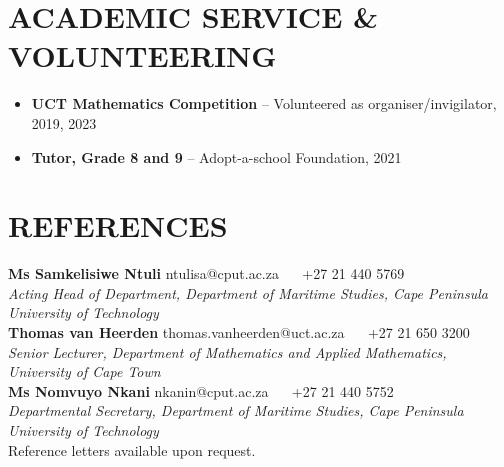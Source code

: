 \documentclass[letterpaper,11pt]{article}
\newcommand{\resumeItem}[1]{
  \item\small{
    {#1 \vspace{-1pt}}
  }
}
\newcommand{\resumeItemListStart}{\begin{itemize}[leftmargin=0.1in]}
\newcommand{\resumeItemListEnd}{\end{itemize}\vspace{-5pt}}
\begin{document}
\vspace{4pt}

\section{\color{airforceblue}ACADEMIC SERVICE \& VOLUNTEERING}

      \resumeItemListStart
        \resumeItem{\normalsize{\textbf{UCT Mathematics Competition} -- Volunteered as organiser/invigilator, 2019, 2023}}
        \vspace{-3pt}
        \resumeItem{\normalsize{\textbf{Tutor, Grade 8 and 9} -- Adopt-a-school Foundation, 2021}}
      \resumeItemListEnd

\vspace{4pt}

\section{\color{airforceblue}REFERENCES}
 \begin{itemize}[leftmargin=0in, label={}]
    \small{\item{
     \textbf{\normalsize{Ms Samkelisiwe Ntuli}} \hfill \normalsize{ntulisa@cput.ac.za ~\textbar~ +27 21 440 5769} \\
     \normalsize{\textit{Acting Head of Department, Department of Maritime Studies, Cape Peninsula University of Technology}} \\
      \vspace{6pt}
     \textbf{\normalsize{Thomas van Heerden}} \hfill \normalsize{thomas.vanheerden@uct.ac.za ~\textbar~ +27 21 650 3200} \\
     \normalsize{\textit{Senior Lecturer, Department of Mathematics and Applied Mathematics, University of Cape Town}} \\
      \vspace{6pt}
     \textbf{\normalsize{Ms Nomvuyo Nkani}} \hfill \normalsize{nkanin@cput.ac.za ~\textbar~ +27 21 440 5752} \\
     \normalsize{\textit{Departmental Secretary, Department of Maritime Studies, Cape Peninsula University of Technology}} \\
      \vspace{6pt}
     \normalsize{Reference letters available upon request.}
     }}
 \end{itemize}
\end{document}
